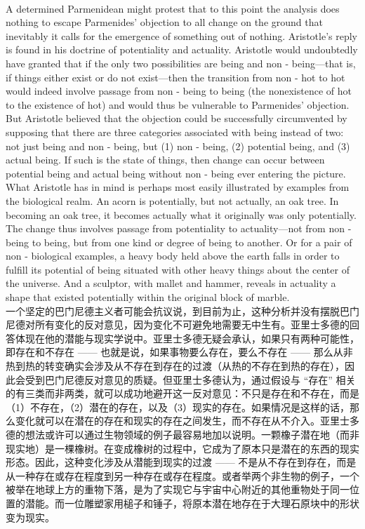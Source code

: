 \documentclass{article}
\begin{document}
\\
A determined Parmenidean might protest that to this point the analysis does nothing to escape Parmenides’ objection to all change on the ground that inevitably it calls for the emergence of something out of nothing. Aristotle’s reply is found in his doctrine of potentiality and actuality. Aristotle would undoubtedly have granted that if the only two possibilities are being and non - being—that is, if things either exist or do not exist—then the transition from non - hot to hot would indeed involve passage from non - being to being (the nonexistence of hot to the existence of hot) and would thus be vulnerable to Parmenides’ objection. But Aristotle believed that the objection could be successfully circumvented by supposing that there are three categories associated with being instead of two: not just being and non - being, but (1) non - being, (2) potential being, and (3) actual being. If such is the state of things, then change can occur between potential being and actual being without non - being ever entering the picture. What Aristotle has in mind is perhaps most easily illustrated by examples from the biological realm. An acorn is potentially, but not actually, an oak tree. In becoming an oak tree, it becomes actually what it originally was only potentially. The change thus involves passage from potentiality to actuality—not from non - being to being, but from one kind or degree of being to another. Or for a pair of non - biological examples, a heavy body held above the earth falls in order to fulfill its potential of being situated with other heavy things about the center of the universe. And a sculptor, with mallet and hammer, reveals in actuality a shape that existed potentially within the original block of marble.\\
一个坚定的巴门尼德主义者可能会抗议说，到目前为止，这种分析并没有摆脱巴门尼德对所有变化的反对意见，因为变化不可避免地需要无中生有。亚里士多德的回答体现在他的潜能与现实学说中。亚里士多德无疑会承认，如果只有两种可能性，即存在和不存在 —— 也就是说，如果事物要么存在，要么不存在 —— 那么从非热到热的转变确实会涉及从不存在到存在的过渡（从热的不存在到热的存在），因此会受到巴门尼德反对意见的质疑。但亚里士多德认为，通过假设与 “存在” 相关的有三类而非两类，就可以成功地避开这一反对意见：不只是存在和不存在，而是（1）不存在，（2）潜在的存在，以及（3）现实的存在。如果情况是这样的话，那么变化就可以在潜在的存在和现实的存在之间发生，而不存在从不介入。亚里士多德的想法或许可以通过生物领域的例子最容易地加以说明。一颗橡子潜在地（而非现实地）是一棵橡树。在变成橡树的过程中，它成为了原本只是潜在的东西的现实形态。因此，这种变化涉及从潜能到现实的过渡 —— 不是从不存在到存在，而是从一种存在或存在程度到另一种存在或存在程度。或者举两个非生物的例子，一个被举在地球上方的重物下落，是为了实现它与宇宙中心附近的其他重物处于同一位置的潜能。而一位雕塑家用槌子和锤子，将原本潜在地存在于大理石原块中的形状变为现实。\\
\end{document}
